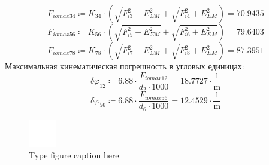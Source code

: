 \documentclass{article}
\newcommand{\defeq}{\coloneq} %
\begin{document}
\begin{equation*}
\textit{F}_{\textit{iomax34}} \defeq \textit{K}_{\textit{34}} \cdot \left( \sqrt{\textit{F}_{\textit{i3}}^{2}+E_{ΣM}^{2}}+\sqrt{\textit{F}_{\textit{i4}}^{2}+E_{ΣM}^{2}} \right) = {70.9435}
\end{equation*}
\begin{equation*}
\textit{F}_{\textit{iomax56}} \defeq \textit{K}_{\textit{56}} \cdot \left( \sqrt{\textit{F}_{\textit{i5}}^{2}+E_{ΣM}^{2}}+\sqrt{\textit{F}_{\textit{i6}}^{2}+E_{ΣM}^{2}} \right) = {79.6403}
\end{equation*}
\begin{equation*}
\textit{F}_{\textit{iomax78}} \defeq \textit{K}_{\textit{78}} \cdot \left( \sqrt{\textit{F}_{\textit{i7}}^{2}+E_{ΣM}^{2}}+\sqrt{\textit{F}_{\textit{i8}}^{2}+E_{ΣM}^{2}} \right) = {87.3951}
\end{equation*}
\colorbox[HTML]{000000}{Максимальная кинематическая погрешность в угловых единицах:}\newline
\begin{equation*}
\textit{δφ}_{\textit{12}} \defeq 6.88 \cdot \frac{\textit{F}_{\textit{iomax12}}}{\textit{d}_{\textit{2}} \cdot 1000} = {18.7727 \cdot \frac{1}{\mathrm{m}}}
\end{equation*}
\begin{equation*}
\textit{δφ}_{\textit{56}} \defeq 6.88 \cdot \frac{\textit{F}_{\textit{iomax56}}}{\textit{d}_{\textit{6}} \cdot 1000} = {12.4529 \cdot \frac{1}{\mathrm{m}}}
\end{equation*}
\begin{figure}[h!]
 \begin{center}
  \includegraphics[max width=\textwidth]{calculations/827.png}
  \caption{Type figure caption here}
  \label{fig:827}
 \end{center}
\end{figure}
\end{document}

